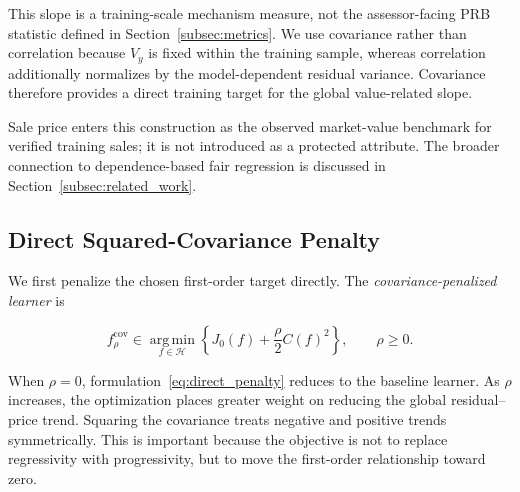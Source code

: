 \documentclass[10pt]{article}
\theoremstyle{definition}
\newcommand{\1}{\mathbf{1}}
\newcommand{\Hcal}{\mathcal{H}}
\newcommand{\argminop}{\operatorname*{arg\,min}}
\begin{document}
{{This slope is a training-scale mechanism measure, not the assessor-facing PRB statistic defined in Section~\ref{subsec:metrics}. We use covariance rather than correlation because $V_y$ is fixed within the training sample, whereas correlation additionally normalizes by the model-dependent residual variance. Covariance therefore provides a direct training target for the global value-related slope.}

{Sale price enters this construction as the observed market-value benchmark for verified training sales; it is not introduced as a protected attribute. The broader connection to dependence-based fair regression is discussed in Section~\ref{subsec:related_work}.}


\subsection{{Direct Squared-Covariance Penalty}}
\label{subsec:direct_penalty}

{We first penalize the chosen first-order target directly. The \emph{covariance-penalized learner} is}


{
\begin{equation}
\label{eq:direct_penalty}
f_\rho^{\mathrm{cov}}
\in
\argminop_{f\in\Hcal}
\left\{
J_0(f)+\frac{\rho}{2}C(f)^2
\right\},
\qquad
\rho\geq 0.
\end{equation}
}

When $\rho=0$, formulation~\eqref{eq:direct_penalty} reduces to the baseline learner. As $\rho$ increases, the optimization places greater weight on reducing the global residual--price trend. Squaring the covariance treats negative and positive trends symmetrically. This is important because the objective is not to replace regressivity with progressivity, but to move the first-order relationship toward zero.


}
\end{document}
